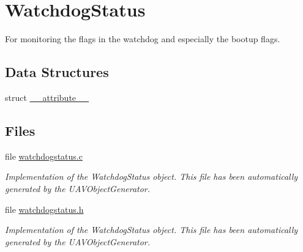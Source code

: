 \hypertarget{group___watchdog_status}{\section{\-Watchdog\-Status}
\label{group___watchdog_status}
}


\-For monitoring the flags in the watchdog and especially the bootup flags.  


\subsection*{\-Data \-Structures}
\begin{DoxyCompactItemize}
\item 
struct \hyperlink{struct____attribute____}{\-\_\-\-\_\-attribute\-\_\-\-\_\-}
\end{DoxyCompactItemize}
\subsection*{\-Files}
\begin{DoxyCompactItemize}
\item 
file \hyperlink{watchdogstatus_8c}{watchdogstatus.\-c}
\begin{DoxyCompactList}\small\item\em \-Implementation of the \-Watchdog\-Status object. \-This file has been automatically generated by the \-U\-A\-V\-Object\-Generator. \end{DoxyCompactList}\item 
file \hyperlink{watchdogstatus_8h}{watchdogstatus.\-h}
\begin{DoxyCompactList}\small\item\em \-Implementation of the \-Watchdog\-Status object. \-This file has been automatically generated by the \-U\-A\-V\-Object\-Generator. \end{DoxyCompactList}\end{DoxyCompactItemize}
